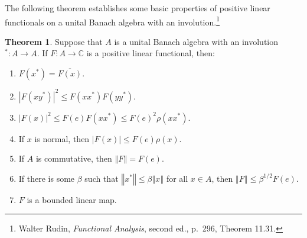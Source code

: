 \documentclass{article}
\newcommand{\norm}[1]{\left\Vert #1 \right\Vert}
\theoremstyle{definition}
\newtheorem{theorem}{Theorem}
\theoremstyle{definition}
\begin{document}
The following theorem establishes some basic properties of 
positive linear functionals on a unital Banach algebra with an involution.\footnote{Walter Rudin, {\em Functional Analysis}, second ed., p.~296, Theorem 11.31.}

\begin{theorem}
Suppose that $A$ is a unital Banach algebra with an involution $^*:A \to A$. 
If $F:A \to \mathbb{C}$ is a positive linear functional, then:
\begin{enumerate}
\item $F(x^*)=\overline{F(x)}$.
\item $|F(xy^*)|^2 \leq F(xx^*)F(yy^*)$.
\item $|F(x)|^2 \leq F(e)F(xx^*) \leq F(e)^2 \rho(xx^*)$.
\item If $x$ is normal, then $|F(x)| \leq F(e)\rho(x)$.
\item If $A$ is commutative, then $\norm{F}=F(e)$. 
\item If there is some $\beta$ such that $\norm{x^*} \leq 
\beta \norm{x}$ for all $x \in A$, then $\norm{F} \leq \beta^{1/2} F(e)$.
\item $F$ is a bounded linear map. 
\end{enumerate}
\label{positivefunctional}
\end{theorem}
\end{document}
